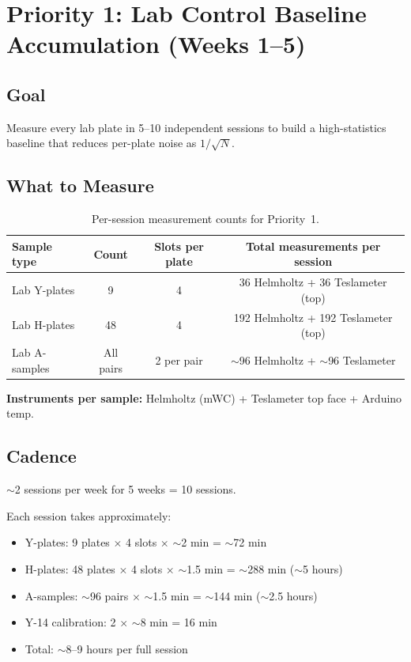 \documentclass[11pt,letterpaper]{article}
\begin{document}
\section{Priority 1: Lab Control Baseline Accumulation (Weeks 1--5)}
\label{sec:p1}

\subsection{Goal}

Measure every lab plate in 5--10 independent sessions to build a high-statistics
baseline that reduces per-plate noise as $1/\sqrt{N}$.

\subsection{What to Measure}

\begin{table}[htbp]
\centering
\caption{Per-session measurement counts for Priority~1.}
\label{tab:p1-counts}
\begin{tabular}{@{}lccc@{}}
\toprule
Sample type & Count & Slots per plate & Total measurements per session \\
\midrule
Lab Y-plates  & 9  & 4 & 36 Helmholtz + 36 Teslameter (top) \\
Lab H-plates  & 48 & 4 & 192 Helmholtz + 192 Teslameter (top) \\
Lab A-samples & All pairs & 2 per pair & ${\sim}$96 Helmholtz + ${\sim}$96 Teslameter \\
\bottomrule
\end{tabular}
\end{table}

\textbf{Instruments per sample:} Helmholtz (mWC) + Teslameter top face + Arduino
temp.

\subsection{Cadence}

${\sim}$2 sessions per week for 5 weeks = 10 sessions.

Each session takes approximately:
\begin{itemize}[nosep]
  \item Y-plates: 9 plates $\times$ 4 slots $\times$ ${\sim}$2 min = ${\sim}$72 min
  \item H-plates: 48 plates $\times$ 4 slots $\times$ ${\sim}$1.5 min = ${\sim}$288 min (${\sim}$5 hours)
  \item A-samples: ${\sim}$96 pairs $\times$ ${\sim}$1.5 min = ${\sim}$144 min (${\sim}$2.5 hours)
  \item Y-14 calibration: 2 $\times$ ${\sim}$8 min = 16 min
  \item Total: ${\sim}$8--9 hours per full session
\end{itemize}
\end{document}
